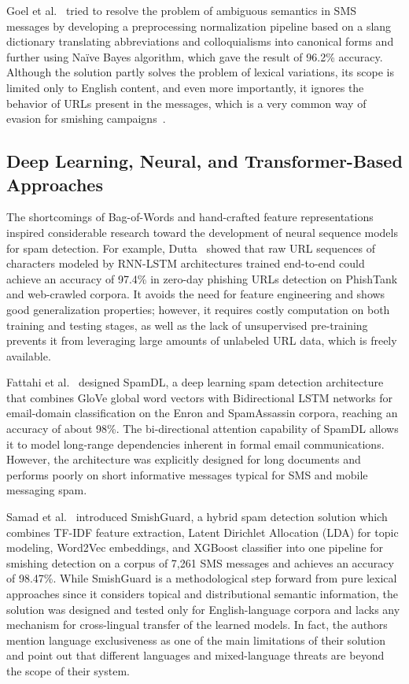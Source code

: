 \documentclass[journal]{IEEEtran}
\begin{document}
Goel et al.~\cite{ref5} tried to resolve the problem of ambiguous semantics in SMS messages by developing a preprocessing normalization pipeline based on a slang dictionary translating abbreviations and colloquialisms into canonical forms and further using Naïve Bayes algorithm, which gave the result of 96.2\% accuracy. Although the solution partly solves the problem of lexical variations, its scope is limited only to English content, and even more importantly, it ignores the behavior of URLs present in the messages, which is a very common way of evasion for smishing campaigns~\cite{ref10}.

\subsection{Deep Learning, Neural, and Transformer-Based Approaches}

The shortcomings of Bag-of-Words and hand-crafted feature
representations inspired considerable research toward the development of
neural sequence models for spam detection. For example, Dutta~\cite{ref3}
showed that raw URL sequences of characters modeled by RNN-LSTM
architectures trained end-to-end could achieve an accuracy of 97.4\% in
zero-day phishing URLs detection on PhishTank and web-crawled corpora.
It avoids the need for feature engineering and shows good generalization
properties; however, it requires costly computation on both training and
testing stages, as well as the lack of unsupervised pre-training
prevents it from leveraging large amounts of unlabeled URL data, which
is freely available.

Fattahi et al.~\cite{ref9} designed SpamDL, a deep learning spam detection
architecture that combines GloVe global word vectors with Bidirectional
LSTM networks for email-domain classification on the Enron and
SpamAssassin corpora, reaching an accuracy of about 98\%. The
bi-directional attention capability of SpamDL allows it to model
long-range dependencies inherent in formal email communications.
However, the architecture was explicitly designed for long documents and
performs poorly on short informative messages typical for SMS and mobile
messaging spam.

Samad et al.~\cite{ref6} introduced SmishGuard, a hybrid spam detection
solution which combines TF-IDF feature extraction, Latent Dirichlet
Allocation (LDA) for topic modeling, Word2Vec embeddings, and XGBoost
classifier into one pipeline for smishing detection on a corpus of 7,261
SMS messages and achieves an accuracy of 98.47\%. While SmishGuard is a
methodological step forward from pure lexical approaches since it
considers topical and distributional semantic information, the solution
was designed and tested only for English-language corpora and lacks any
mechanism for cross-lingual transfer of the learned models. In fact, the
authors mention language exclusiveness as one of the main limitations of
their solution and point out that different languages and mixed-language
threats are beyond the scope of their system.
\end{document}
